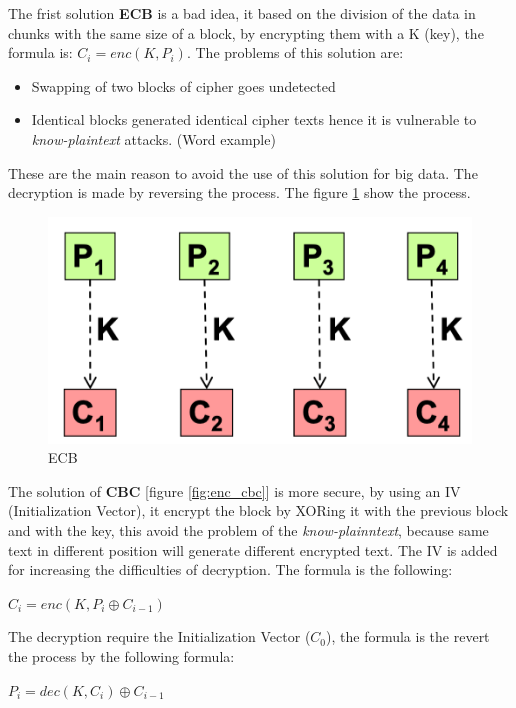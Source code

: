 \documentclass[12pt]{article}
\begin{document}
The frist solution \textbf{ECB} is a bad idea, it based on the division of the data in chunks with the same size of a block, by encrypting them with a K (key), the formula is: $C_i = enc(K, P_i)$. The problems of this solution are:
\begin{itemize}
  \item Swapping of two blocks of cipher goes undetected
  \item Identical blocks generated identical cipher texts hence it is vulnerable to \textit{know-plaintext} attacks. (Word example)
\end{itemize}
These are the main reason to avoid the use of this solution for big data. The decryption is made by reversing the process. The figure \ref{fig:ecb} show the process.
\begin{figure}[H]
  \includegraphics[width=\linewidth]{images/ecb.png}
  \caption{ECB}
  \label{fig:ecb}
\end{figure}
The solution of \textbf{CBC} [figure \ref{fig:enc_cbc}] is more secure, by using an IV (Initialization Vector), it encrypt the block by XORing it with the previous block and with the key, this avoid the problem of the \textit{know-plainntext}, because same text in different position will generate different encrypted text. The IV is added for increasing the difficulties of decryption. The formula is the following:
\begin{center}
  $C_i = enc(K, P_i \oplus C_{i-1})$
\end{center}
The decryption require the Initialization Vector ($C_{0}$), the formula is the revert the process by the following formula:
\begin{center}
  $P_i = dec(K, C_i)\oplus C_{i-1}$
\end{center}
\end{document}
